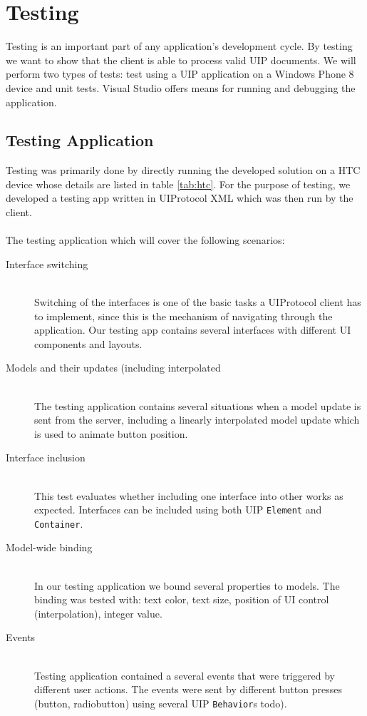 \chapter{Testing}
Testing is an important part of any application's development cycle. By testing we want to show that the client is able to process valid UIP documents. We will perform two types of tests: test using a UIP application on a Windows Phone 8 device and unit tests. Visual Studio offers means for running and debugging the application.

\section{Testing Application}
Testing was primarily done by directly running the developed solution on a HTC device whose details are listed in table \ref{tab:htc}. For the purpose of testing, we developed a testing app written in UIProtocol XML which was then run by the client.\\\\
The testing application which will cover the following scenarios:\\

\begin{description}
\item[Interface switching] \hfill \\
  Switching of the interfaces is one of the basic tasks a UIProtocol client has to implement, since this is the mechanism of navigating through the application. Our testing app contains several interfaces with different UI components and layouts.
\item[Models and their updates (including interpolated] \hfill \\
  The testing application contains several situations when a model update is sent from the server, including a linearly interpolated model update which is used to animate button position.
  \item[Interface inclusion] \hfill \\
  This test evaluates whether including one interface into other works as expected. Interfaces can be included using both UIP \texttt{Element} and \texttt{Container}.
  \item[Model-wide binding] \hfill \\
  In our testing application we bound several properties to models. The binding was tested with: text color, text size, position of UI control (interpolation), integer value.
    \item[Events] \hfill \\
    Testing application contained a several events that were triggered by different user actions. The events were sent by different button presses (button, radiobutton) using several UIP \texttt{Behavior}s todo).
\end{description}

